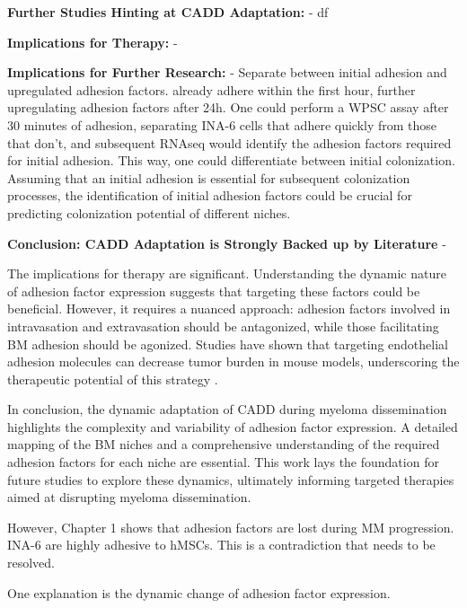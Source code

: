 \textbf{Further Studies Hinting at \ac{CADD} Adaptation:}
- df



\textbf{Implications for Therapy:}
-



\textbf{Implications for Further Research:}
- Separate between initial adhesion and upregulated adhesion factors. \INA
already adhere within the first hour, further upregulating adhesion factors
after 24h. One could perform a \ac{WPSC} assay after 30 minutes of adhesion,
separating INA-6 cells that adhere quickly from those that don't, and subsequent
RNAseq would identify the adhesion factors required for initial adhesion. This
way, one could differentiate between initial colonization. Assuming that an
initial adhesion is essential for subsequent colonization processes, the
identification of initial adhesion factors could be crucial for predicting
colonization potential of different niches.



\textbf{Conclusion: CADD Adaptation is Strongly Backed up by Literature}
-


The implications for therapy are significant. Understanding the dynamic nature
of adhesion factor expression suggests that targeting these factors could be
beneficial. However, it requires a nuanced approach: adhesion factors involved
in intravasation and extravasation should be antagonized, while those
facilitating BM adhesion should be agonized. Studies have shown that targeting
endothelial adhesion molecules can decrease tumor burden in mouse models,
underscoring the therapeutic potential of this strategy
\cite{asosinghUniquePathwayHoming2001a,
      mrozikTherapeuticTargetingNcadherin2015}.

In conclusion, the dynamic adaptation of \ac{CADD} during myeloma dissemination
highlights the complexity and variability of adhesion factor expression. A
detailed mapping of the BM niches and a comprehensive understanding of the
required adhesion factors for each niche are essential. This work lays the
foundation for future studies to explore these dynamics, ultimately informing
targeted therapies aimed at disrupting myeloma dissemination.





However,  Chapter 1 shows that adhesion factors are
lost during MM progression. INA-6 are highly adhesive to hMSCs.
This is a contradiction that needs to be resolved.

One explanation is the dynamic change of adhesion factor expression.

